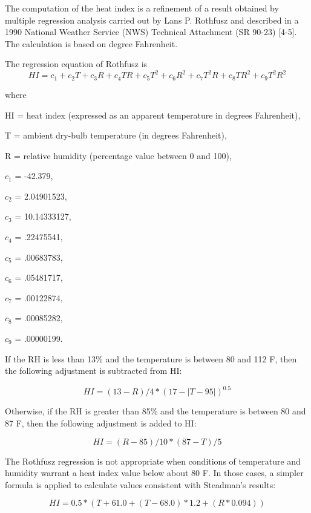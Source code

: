 The computation of the heat index is a refinement of a result obtained by multiple regression analysis carried out by Lans P. Rothfusz and described in a 1990 National Weather Service (NWS) Technical Attachment (SR 90-23) [4-5]. The calculation is based on degree Fahrenheit.

The regression equation of Rothfusz is
\begin{equation}  \label{eq:rm-1}
HI = c_1 + c_2T + c_3R + c_4TR + c_5T^2 + c_6R^2 + c_7T^2R + c_8TR^2 + c_9T^2R^2
\end{equation}

where

HI = heat index (expressed as an apparent temperature in degrees Fahrenheit),

T = ambient dry-bulb temperature (in degrees Fahrenheit),

R = relative humidity (percentage value between 0 and 100),

$c_1$ = -42.379,

$c_2$ = 2.04901523,

$c_3$ = 10.14333127,

$c_4$ = .22475541,

$c_5$ = .00683783,

$c_6$ = .05481717,

$c_7$ = .00122874,

$c_8$ = .00085282,

$c_9$ = .00000199.

If the RH is less than 13\% and the temperature is between 80 and 112 \degree F, then the following adjustment is subtracted from HI:

\begin{equation}  \label{eq:rm-2}
HI = (13 - R) / 4 * (17 - |T - 95|)^{0.5}
\end{equation}

Otherwise, if the RH is greater than 85\% and the temperature is between 80 and 87 \degree F, then the following adjustment is added to HI:

\begin{equation}  \label{eq:rm-3}
HI = (R - 85) / 10 * (87 - T) / 5
\end{equation}

The Rothfusz regression is not appropriate when conditions of temperature and humidity warrant a heat index value below about 80 \degree F. In those cases, a simpler formula is applied to calculate values consistent with Steadman's results:

\begin{equation}  \label{eq:rm-4}
HI = 0.5 * (T + 61.0 + (T - 68.0) * 1.2 + (R * 0.094))
\end{equation}

